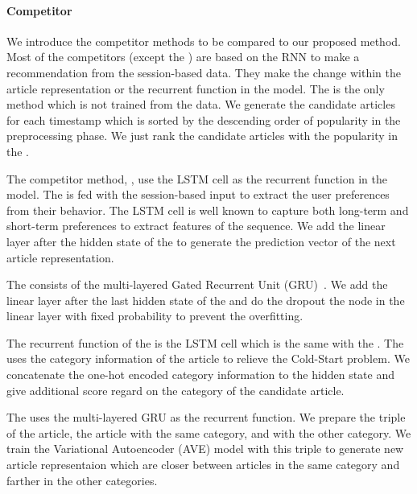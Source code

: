 \paragraph{\textbf{Competitor}}
We introduce the competitor methods to be compared to our proposed method.
Most of the competitors (except the \compPopName) are based on the RNN to make a recommendation from the session-based data.
They make the change within the article representation or the recurrent function in the model.
The \compPop is the only method which is not trained from the data.
We generate the candidate articles for each timestamp which is sorted by the descending order of popularity in the preprocessing phase.
We just rank the candidate articles with the popularity in the \compPopName.

The competitor method, \compLSTMName, use the LSTM cell as the recurrent function in the model.
The \compLSTM is fed with the session-based input to extract the user preferences from their behavior.
The LSTM cell is well known to capture both long-term and short-term preferences to extract features of the sequence.
We add the linear layer after the hidden state of the \compLSTM to generate the prediction vector of the next article representation.

The \compGruRec consists of the multi-layered Gated Recurrent Unit (GRU)~\cite{GRU}.
We add the linear layer after the last hidden state of the \compGruRec and do the dropout the node in the linear layer with fixed probability to prevent the overfitting.

The recurrent function of the \compNaver is the LSTM cell which is the same with the \compLSTMName.
The \compNaver uses the category information of the article to relieve the Cold-Start problem.
We concatenate the one-hot encoded category information to the hidden state and give additional score regard on the category of the candidate article.

The \compYahoo uses the multi-layered GRU as the recurrent function.
We prepare the triple of the article, the article with the same category, and with the other category.
We train the Variational Autoencoder (AVE) model with this triple to generate new article representaion which are closer between articles in the same category and farther in the other categories.

